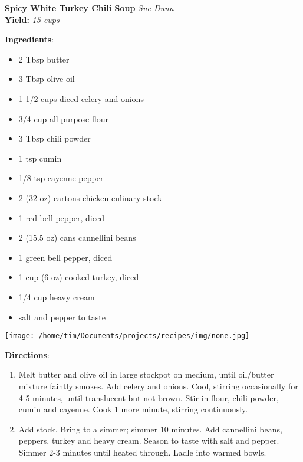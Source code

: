 \documentclass[11pt, twoside, openany]{book}
\begin{document}
\noindent\begin{minipage}[t]{\linewidth}%
{\Large\textbf{Spicy White Turkey Chili Soup}} \label{spicy-white-turkey-chili-soup}\hfill\textit{Sue Dunn}\\
\textbf{Yield:} \textit{15 cups}\\
\noindent\begin{minipage}[t]{0.78\linewidth}%
\textbf{Ingredients}:\vspace{-3mm}
\begin{multicols}{2}
\begin{itemize}\setlength\itemsep{-1mm}
\item 2 Tbsp butter
\item 3 Tbsp olive oil
\item 1 1/2 cups diced celery and onions
\item 3/4 cup all-purpose flour
\item 3 Tbsp chili powder
\item 1 tsp cumin
\item 1/8 tsp cayenne pepper
\item 2 (32 oz) cartons chicken culinary stock
\item 1 red bell pepper, diced
\item 2 (15.5 oz) cans cannellini beans
\item 1 green bell pepper, diced
\item 1 cup (6 oz) cooked turkey, diced
\item 1/4 cup heavy cream
\item salt and pepper to taste
\end{itemize}
\end{multicols}
\end{minipage}
\noindent\begin{minipage}[t]{0.18\linewidth}
\centering \strut\vspace*{-\baselineskip}\newline
\texttt{[image: /home/tim/Documents/projects/recipes/img/none.jpg]}\\
\end{minipage}\vspace{3mm}
\textbf{Directions}:
\vspace{-3mm}\begin{enumerate}\setlength\itemsep{-1mm}
\item Melt butter and olive oil in large stockpot on medium, until oil/butter mixture faintly smokes. Add celery and onions. Cool, stirring occasionally for 4-5 minutes, until translucent but not brown. Stir in flour, chili powder, cumin and cayenne. Cook 1 more minute, stirring continuously.
\item Add stock. Bring to a simmer; simmer 10 minutes. Add cannellini beans, peppers, turkey and heavy cream. Season to taste with salt and pepper. Simmer 2-3 minutes until heated through. Ladle into warmed bowls.
\end{enumerate}
\end{minipage}\vspace{8mm}
\end{document}

